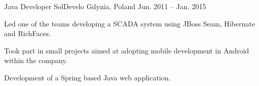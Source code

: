 
\begin{cventries}

  \cventry
    {Java Developer} %
    {SolDevelo} %
    {Gdynia, Poland} %
    {Jun. 2011 – Jan. 2015} %
    {
      \begin{cvitems} %
        \item {Led one of the teams developing a SCADA system using JBoss Seam, Hibernate and RichFaces.}
        \item {Took part in small projects aimed at adopting mobile development in Android within the company.}
        \item {Development of a Spring based Java web application.}
      \end{cvitems}
    }
\end{cventries}
